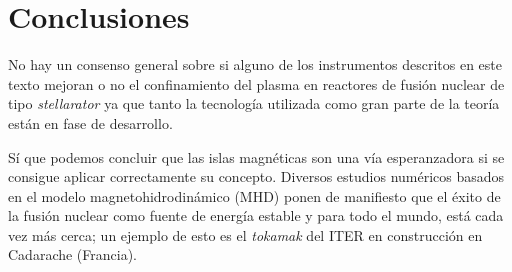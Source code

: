 \chapter{Conclusiones}
No hay un consenso general sobre si alguno de los instrumentos descritos en este
texto mejoran o no el confinamiento del plasma en reactores de fusión nuclear de tipo
\textit{stellarator} ya que tanto la tecnología utilizada como 
gran parte de la teoría están en fase de desarrollo.\par
Sí que podemos concluir que las islas magnéticas son una vía esperanzadora si se
consigue aplicar correctamente su concepto. 
Diversos estudios numéricos basados en el modelo magnetohidrodinámico (MHD)
ponen de manifiesto que el éxito de la fusión nuclear como fuente de energía
estable y para todo el mundo, está cada vez más cerca; un ejemplo de esto 
es el \textit{tokamak} del ITER en construcción en Cadarache (Francia).